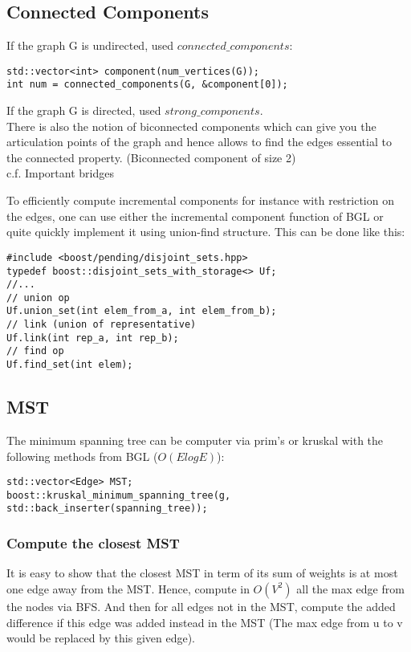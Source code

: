 \documentclass{article}
\begin{document}
\subsection{Connected Components}
If the graph G is undirected, used $connected\_components$:
\begin{lstlisting}[frame=single]
std::vector<int> component(num_vertices(G));
int num = connected_components(G, &component[0]);
\end{lstlisting}
If the graph G is directed, used $strong\_components$. \\
There is also the notion of biconnected components which can give you the articulation points of the graph and hence allows to find the edges essential to the connected property. (Biconnected component of size 2) \\
c.f. Important bridges

To efficiently compute incremental components for instance with restriction on the edges, one can use either the incremental component function of BGL or quite quickly implement it using union-find structure. This can be done like this:

\begin{lstlisting}[frame=single]
#include <boost/pending/disjoint_sets.hpp>
typedef boost::disjoint_sets_with_storage<> Uf;
//...
// union op
Uf.union_set(int elem_from_a, int elem_from_b);
// link (union of representative)
Uf.link(int rep_a, int rep_b);
// find op
Uf.find_set(int elem);
\end{lstlisting}

\subsection{MST}
The minimum spanning tree can be computer via prim's or kruskal with the following methods from BGL ($O(E log E)$):
\begin{lstlisting}[frame=single]
std::vector<Edge> MST;
boost::kruskal_minimum_spanning_tree(g, std::back_inserter(spanning_tree));
\end{lstlisting}

\subsubsection{Compute the closest MST}
It is easy to show that the closest MST in term of its sum of weights is at most one edge away from the MST.
Hence, compute in $O(V^2)$ all the max edge from the nodes via BFS. And then for all edges not in the MST, compute the added difference if this edge was added instead in the MST (The max edge from u to v would be replaced by this given edge).
\end{document}
